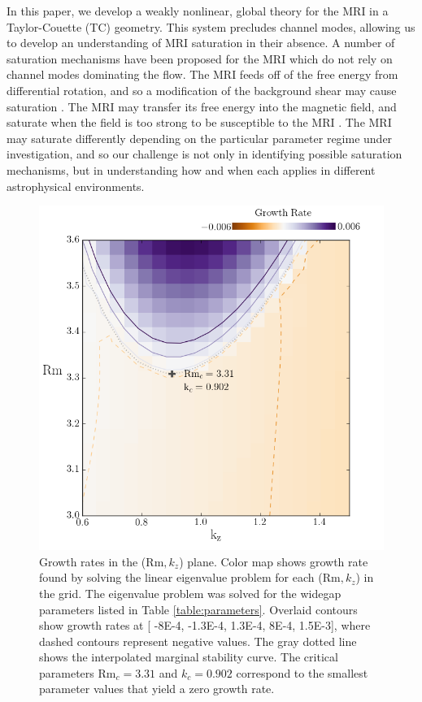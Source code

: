 \documentclass{emulateapj}
\newcommand\reym{\mathrm{Rm}}
\begin{document}
In this paper, we develop a weakly nonlinear, global theory for the MRI in a Taylor-Couette (TC) geometry. This system precludes channel modes, allowing us to develop an understanding of MRI saturation in their absence. A number of saturation mechanisms have been proposed for the MRI which do not rely on channel modes dominating the flow. The MRI feeds off of the free energy from differential rotation, and so a modification of the background shear may cause saturation \citep{Knobloch:2005ba, Umurhan:2007hs}. The MRI may transfer its free energy into the magnetic field, and saturate when the field is too strong to be susceptible to the MRI \citep{Ebrahimi:2009ey}. The MRI may saturate differently depending on the particular parameter regime under investigation, and so our challenge is not only in identifying possible saturation mechanisms, but in understanding how and when each applies in different astrophysical environments. 

\begin{figure}
\centering
\includegraphics[width=\columnwidth]{../figures/widegap_paramspace_crit_params_Pm_16E-7}
\caption{Growth rates in the ($\reym, k_z$) plane. Color map shows growth rate found by solving the linear eigenvalue problem for each ($\reym, k_z$) in the grid. The eigenvalue problem was solved for the widegap parameters listed in Table \ref{table:parameters}. Overlaid contours show growth rates at [ -8E-4, -1.3E-4, 1.3E-4, 8E-4, 1.5E-3], where dashed contours represent negative values. The gray dotted line shows the interpolated marginal stability curve. The critical parameters $\reym_c = 3.31$ and $k_c = 0.902$ correspond to the smallest parameter values that yield a zero growth rate.}\label{fig:growth_rates}
\end{figure}
\end{document}
